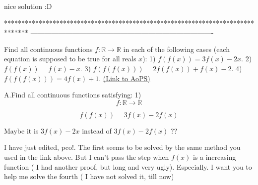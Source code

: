 \begin{solution}
	nice solution :D
\end{solution}
*******************************************************************************
-------------------------------------------------------------------------------

\begin{problem}
	Find all continuous functions $f: \mathbb R \to \mathbb R$ in each of the following cases (each equation is supposed to be true for all reals $x$):
1) $f(f(x)) = 3f(x) - 2x$.
2) $f(f(x)) = f(x) - x$.
3) $f(f(f(x))) = 2f(f(x)) + f(x) - 2$.
4) $f(f(f(x))) = 4f(x) + 1$.
	\flushright \href{https://artofproblemsolving.com/community/c6h284033}{(Link to AoPS)}
\end{problem}



\begin{solution}
	\begin{tcolorbox}A.Find all continuous  functions satisfying:
1)
\[ f: \mathbb R \to \mathbb R
\]

\[ f(f(x)) = 3f(x) - 2f(x)
\]
\end{tcolorbox}

Maybe it is $ 3f(x)-2x$ instead of $ 3f(x)-2f(x)$ ??
\end{solution}



\begin{solution}
	I have just edited, pco!. The first seems to be solved by the same method you used in the link above. But I can't pass the step when $ f(x)$ is a increasing function ( I had another proof, but long and very ugly).
Especially. I want you to help me solve the fourth (  I have not solved it, till now)
\end{solution}



